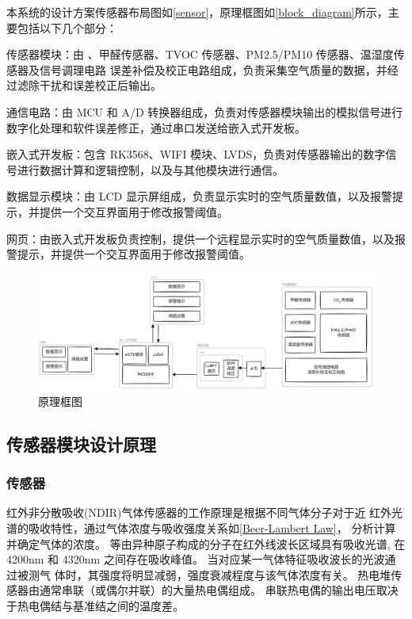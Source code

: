 \documentclass[12pt,hyperref,a4paper,UTF8]{ctexart}
\begin{document}
本系统的设计方案传感器布局图如\autoref{sensor}，原理框图如\autoref{block_diagram}所示，主要包括以下几个部分：

传感器模块：由  、甲醛传感器、TVOC 传感器、PM2.5/PM10 传感器、温湿度传感器及信号调理电路
误差补偿及校正电路组成，负责采集空气质量的数据，并经过滤除干扰和误差校正后输出。

通信电路：由 MCU 和 A/D 转换器组成，负责对传感器模块输出的模拟信号进行数字化处理和软件误差修正，通过串口发送给嵌入式开发板。

嵌入式开发板：包含 RK3568、WIFI 模块、LVDS，负责对传感器输出的数字信号进行数据计算和逻辑控制，以及与其他模块进行通信。

数据显示模块：由 LCD 显示屏组成，负责显示实时的空气质量数值，以及报警提示，并提供一个交互界面用于修改报警阈值。

网页：由嵌入式开发板负责控制，提供一个远程显示实时的空气质量数值，以及报警提示，并提供一个交互界面用于修改报警阈值。

\begin{figure}[htbp]
    \centering
    \includegraphics[width =.9\textwidth]{figures/block_diagram.png}
    \caption{原理框图}
    \label{block_diagram}
\end{figure}

\subsection{传感器模块设计原理} \label{sensor_design}
\subsubsection{ 传感器}
红外非分散吸收(NDIR)气体传感器的工作原理是根据不同气体分子对于近
红外光谱的吸收特性，通过气体浓度与吸收强度关系如\autoref{Beer-Lambert Law}，
分析计算并确定气体的浓度。 等由异种原子构成的分子在红外线波长区域具有吸收光谱,
 在 4200\unit{nm} 和 4320\unit{nm} 之间存在吸收峰值。
当对应某一气体特征吸收波长的光波通过被测气
体时，其强度将明显减弱，强度衰减程度与该气体浓度有关。
热电堆传感器由通常串联（或偶尔并联）的大量热电偶组成。
串联热电偶的输出电压取决于热电偶结与基准结之间的温度差。
\end{document}
